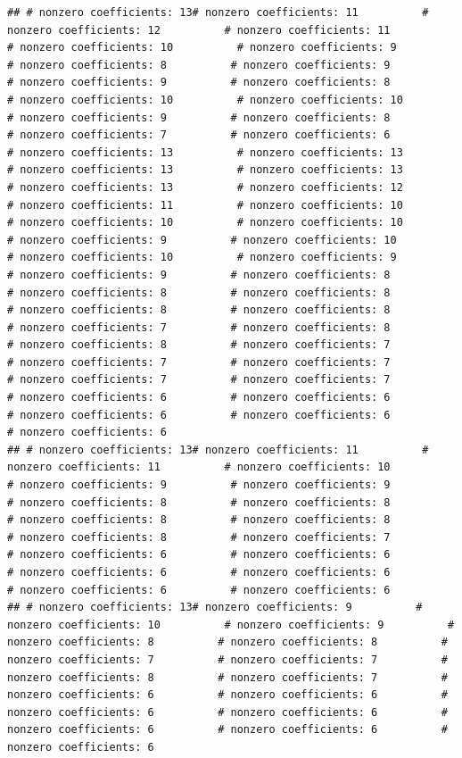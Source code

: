 \documentclass[
]{article}
\begin{document}
\begin{verbatim}
## # nonzero coefficients: 13# nonzero coefficients: 11          # nonzero coefficients: 12          # nonzero coefficients: 11          # nonzero coefficients: 10          # nonzero coefficients: 9          # nonzero coefficients: 8          # nonzero coefficients: 9          # nonzero coefficients: 9          # nonzero coefficients: 8          # nonzero coefficients: 10          # nonzero coefficients: 10          # nonzero coefficients: 9          # nonzero coefficients: 8          # nonzero coefficients: 7          # nonzero coefficients: 6          # nonzero coefficients: 13          # nonzero coefficients: 13          # nonzero coefficients: 13          # nonzero coefficients: 13          # nonzero coefficients: 13          # nonzero coefficients: 12          # nonzero coefficients: 11          # nonzero coefficients: 10          # nonzero coefficients: 10          # nonzero coefficients: 10          # nonzero coefficients: 9          # nonzero coefficients: 10          # nonzero coefficients: 10          # nonzero coefficients: 9          # nonzero coefficients: 9          # nonzero coefficients: 8          # nonzero coefficients: 8          # nonzero coefficients: 8          # nonzero coefficients: 8          # nonzero coefficients: 8          # nonzero coefficients: 7          # nonzero coefficients: 8          # nonzero coefficients: 8          # nonzero coefficients: 7          # nonzero coefficients: 7          # nonzero coefficients: 7          # nonzero coefficients: 7          # nonzero coefficients: 7          # nonzero coefficients: 6          # nonzero coefficients: 6          # nonzero coefficients: 6          # nonzero coefficients: 6          # nonzero coefficients: 6          
## # nonzero coefficients: 13# nonzero coefficients: 11          # nonzero coefficients: 11          # nonzero coefficients: 10          # nonzero coefficients: 9          # nonzero coefficients: 9          # nonzero coefficients: 8          # nonzero coefficients: 8          # nonzero coefficients: 8          # nonzero coefficients: 8          # nonzero coefficients: 8          # nonzero coefficients: 7          # nonzero coefficients: 6          # nonzero coefficients: 6          # nonzero coefficients: 6          # nonzero coefficients: 6          # nonzero coefficients: 6          # nonzero coefficients: 6          
## # nonzero coefficients: 13# nonzero coefficients: 9          # nonzero coefficients: 10          # nonzero coefficients: 9          # nonzero coefficients: 8          # nonzero coefficients: 8          # nonzero coefficients: 7          # nonzero coefficients: 7          # nonzero coefficients: 8          # nonzero coefficients: 7          # nonzero coefficients: 6          # nonzero coefficients: 6          # nonzero coefficients: 6          # nonzero coefficients: 6          # nonzero coefficients: 6          # nonzero coefficients: 6          # nonzero coefficients: 6          

\end{verbatim}
\end{document}
